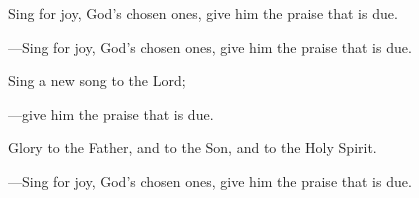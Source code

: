 \responsory
\begin{hangpar}

Sing for joy, God’s chosen ones, give him the praise that is due.

{\color{red}---\thinspace}Sing for joy, God’s chosen ones, give him the praise that is due.

\medskip Sing a new song to the Lord;

{\color{red}---\thinspace}give him the praise that is due.

\medskip Glory to the Father, and to the Son, and to the Holy Spirit.

{\color{red}---\thinspace}Sing for joy, God’s chosen ones, give him the praise that is due.
\end{hangpar}

